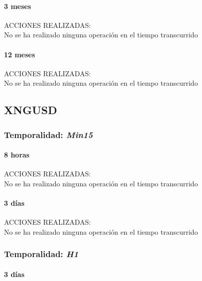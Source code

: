 \paragraph{3 meses}

ACCIONES REALIZADAS:\\

No se ha realizado ninguna operación en el tiempo transcurrido

\paragraph{12 meses}

ACCIONES REALIZADAS:\\

No se ha realizado ninguna operación en el tiempo transcurrido




\subsection{XNGUSD}

\subsubsection{Temporalidad: \textit{Min15}}

\paragraph{8 horas}

ACCIONES REALIZADAS:\\

No se ha realizado ninguna operación en el tiempo transcurrido

\paragraph{3 días}

ACCIONES REALIZADAS:\\

No se ha realizado ninguna operación en el tiempo transcurrido

\subsubsection{Temporalidad: \textit{H1}}

\paragraph{3 días}

